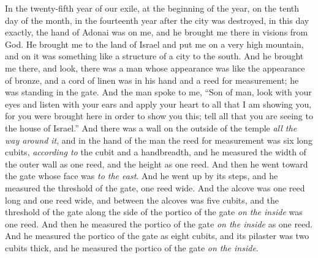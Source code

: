 \begin{biblechapter} %
 In the twenty-fifth year of our exile, at the beginning of the year, on the tenth day of the month, in the fourteenth year after the city was destroyed, in this day exactly, the hand of Adonai was on me, and he brought me there
\verse in visions from God. He brought me to the land of Israel and put me on a very high mountain, and on it was something like a structure of a city to the south.
\verse And he brought me there, and look, there was a man whose appearance was like the appearance of bronze, and a cord of linen was in his hand and a reed for measurement; he was standing in the gate.
\verse And the man spoke to me, “Son of man, look with your eyes and listen with your ears and apply your heart to all that I am showing you, for you were brought here in order to show you this; tell all that you are seeing to the house of Israel.”
 And there was a wall on the outside of the temple \textit{all the way around it}, and in the hand of the man the reed for measurement was six long cubits, \textit{according to} the cubit and a handbreadth, and he measured the width of the outer wall as one reed, and the height as one reed.
\verse And then he went toward the gate whose face was \textit{to the east}. And he went up by its steps, and he measured the threshold of the gate, one reed wide.
\verse And the alcove was one reed long and one reed wide, and between the alcoves was five cubits, and the threshold of the gate along the side of the portico of the gate \textit{on the inside} was one reed.
\verse And then he measured the portico of the gate \textit{on the inside} as one reed.
\verse And he measured the portico of the gate as eight cubits, and its pilaster was two cubits thick, and he measured the portico of the gate \textit{on the inside}.

\end{biblechapter}
